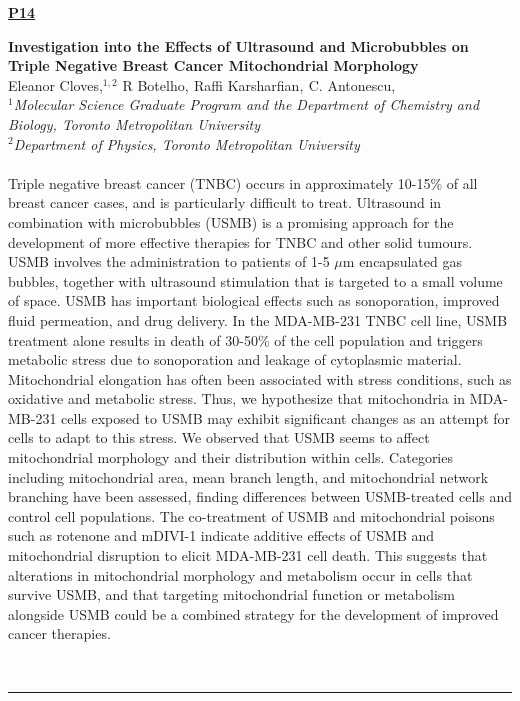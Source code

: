 \documentclass[titlepage,oneside,openany,10pt]{book}
\newenvironment{posterabs}[4] %
        {
	\begin{flushright}
                \underline{\textbf{#4}}
        \end{flushright}
        \textbf{#1}\\%
        #2\\%
        \textit{#3}\\\\%
        }
        {
        \\
        \noindent\rule{15cm}{0.5pt}%
        }
\begin{document}
\vspace{0.6cm}

\begin{posterabs}
	{Investigation into the Effects of Ultrasound and Microbubbles on Triple Negative Breast Cancer Mitochondrial Morphology}
	{Eleanor Cloves,$^{1,2}$ R Botelho,$^{}$ Raffi Karsharfian,$^{}$ C. Antonescu,$^{}$}
	{
	$^1$Molecular Science Graduate Program and the Department of Chemistry and Biology, Toronto Metropolitan University\\
	$^2$Department of Physics, Toronto Metropolitan University
	}
	{P14}
	Triple negative breast cancer (TNBC) occurs in approximately 10-15\% of all breast cancer cases, and is particularly difficult to treat. Ultrasound in combination with microbubbles (USMB) is a promising approach for the development of more effective therapies for TNBC and other solid tumours. USMB involves the administration to patients of 1-5 $\mu$m encapsulated gas bubbles, together with ultrasound stimulation that is targeted to a small volume of space. USMB has important biological effects such as sonoporation, improved fluid permeation, and drug delivery. In the MDA-MB-231 TNBC cell line, USMB treatment alone results in death of 30-50\% of the cell population and triggers metabolic stress due to sonoporation and leakage of cytoplasmic material. Mitochondrial elongation has often been associated with stress conditions, such as oxidative and metabolic stress. Thus, we hypothesize that mitochondria in MDA-MB-231 cells exposed to USMB may exhibit significant changes as an attempt for cells to adapt to this stress. We observed that USMB seems to affect mitochondrial morphology and their distribution within cells. Categories including mitochondrial area, mean branch length, and mitochondrial network branching have been assessed, finding differences between USMB-treated cells and control cell populations. The co-treatment of USMB and mitochondrial poisons such as rotenone and mDIVI-1 indicate additive effects of USMB and mitochondrial disruption to elicit MDA-MB-231 cell death. This suggests that alterations in mitochondrial morphology and metabolism occur in cells that survive USMB, and that targeting mitochondrial function or metabolism alongside USMB could be a combined strategy for the development of improved cancer therapies.
	\label{ClovesE}
\end{posterabs}
\end{document}
